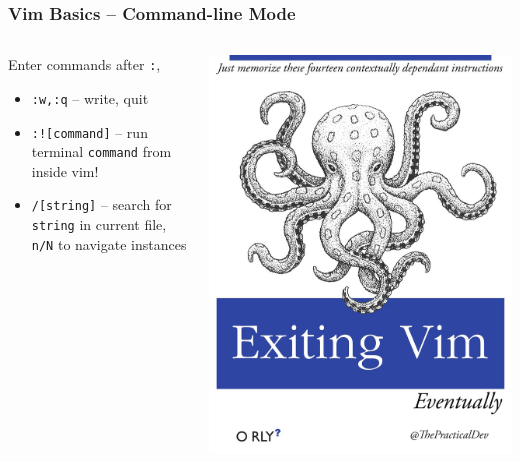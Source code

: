 \documentclass{beamer}
\begin{document}
\begin{frame}
  \frametitle{Vim Basics -- Command-line Mode}
  \begin{columns}
    \begin{column}{.6\textwidth}
  Enter commands after \texttt{:},
  \begin{itemize}
    \item \texttt{:w,:q} -- write, quit 
    \item \texttt{:![command]} -- run terminal \texttt{command} from inside vim!
    \item \texttt{/[string]} -- search for \texttt{string} in current file, \texttt{n/N} to navigate instances
  \end{itemize}
    \end{column}
    \begin{column}{.4\textwidth}
      \includegraphics[width=\linewidth]{vimexit.jpg}
    \end{column}
  \end{columns}
\end{frame}
\end{document}
